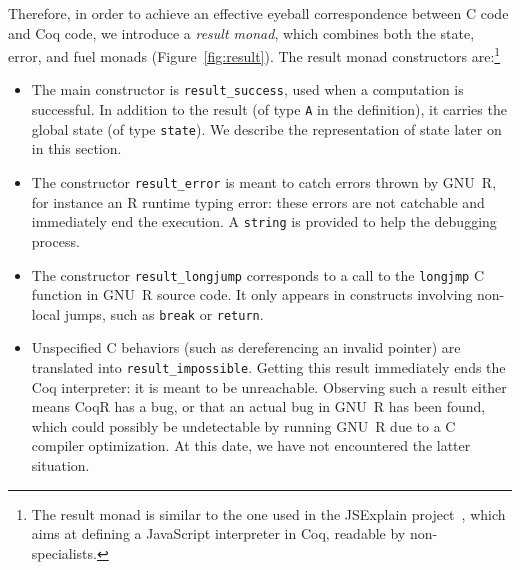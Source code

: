 \documentclass[
    sigplan,
    10pt,
    review, %
    natbib=false %
 ]{acmart}
\newcommand\CoqR{CoqR}
\begin{document}
Therefore, in order to achieve an effective eyeball correspondence between C code and Coq code, we introduce a {\em result monad}, which combines both the state, error, and fuel monads (Figure~\ref{fig:result}).%
%
The result monad constructors are:\footnote{The result monad is similar to the one used in the JSExplain project~\parencite{JSExplain}, which aims at defining a JavaScript interpreter in Coq, readable by non-specialists.
}
\begin{itemize}
\item The main constructor is \texttt{result_success}, used when a computation is successful.
In addition to the result (of type \texttt{A} in the definition),
it carries the global state (of type \texttt{state}). We describe the representation of state later on in this section.
%
\item The constructor \texttt{result_error} is meant to catch
errors thrown by GNU~R, for instance an R runtime typing error:
these errors are not catchable and immediately end the execution.
A \texttt{string} is provided to help the debugging process.
%
\item The constructor \texttt{result_longjump}
corresponds to a call to the \texttt{longjmp}
C function in GNU~R source code.
It only appears in constructs involving non-local jumps,
such as \texttt{break} or \texttt{return}.
%
\item Unspecified C behaviors
(such as dereferencing an invalid pointer)
are translated into
\texttt{result_impossible}.
Getting this result immediately ends the Coq interpreter:
it is meant to be unreachable.
Observing such a result either means \CoqR{} has a bug, or that an actual bug in GNU~R has been found, which could possibly be undetectable by running GNU~R due to a C compiler optimization. At this date, we have not encountered the latter situation.

\end{itemize}
\end{document}
